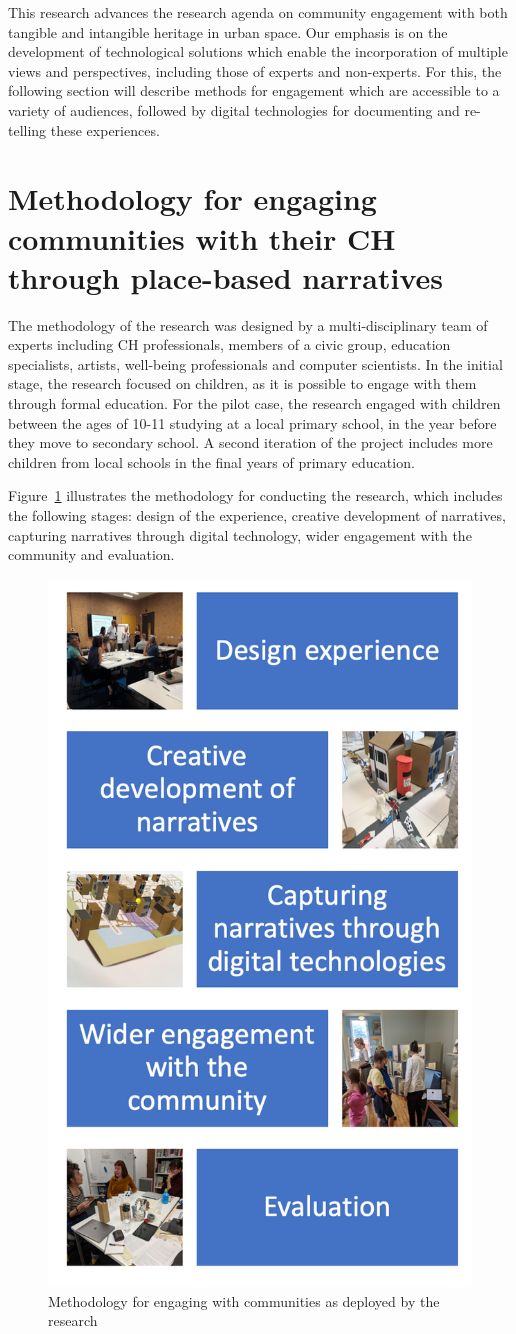 \documentclass[acmlarge,screen,dvipsnames]{acmart}
\begin{document}
This research advances the research agenda on community engagement with both
tangible and intangible heritage in urban space. Our emphasis is on the
development of technological solutions which enable the incorporation of multiple
views and perspectives, including those of experts and non-experts. For this,
the following section will  describe methods for engagement which are
accessible to a variety of audiences, followed by digital technologies for
documenting and re-telling these experiences. 

\section{Methodology for engaging communities with their CH through place-based narratives} 
\label{meth} The methodology of the research was designed by
a multi-disciplinary team of experts including CH
professionals, members of a civic group, education specialists, artists,
well-being professionals and computer scientists. In the initial stage, the
research focused on children, as it is possible to engage with them through
formal education. For the pilot case, the research engaged with children between
the ages of 10-11 studying at a local primary school, in the year before they
move to secondary school. A second iteration of the project includes more children from local schools in the final years of primary education.

Figure~\ref{fig:method} illustrates the methodology for conducting the
research, which includes the following stages: design of the experience,
creative development of narratives, capturing narratives through digital
technology, wider engagement with the community and evaluation.


\begin{figure}[h]
  \centering
  \includegraphics[width=0.3\linewidth]{images/method}
\caption{Methodology for engaging with communities as deployed by the research}
\label{fig:method}
\end{figure}
\end{document}
